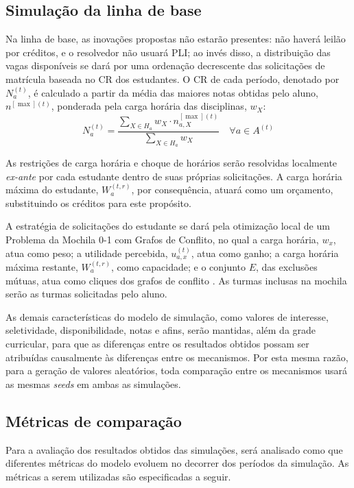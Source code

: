 \documentclass[
    12pt,
    openany,
    oneside,
    a4paper,
    english,
    brazil
]{abntex2}
\begin{document}
\subsection{Simulação da linha de base}

Na linha de base, as inovações propostas não estarão presentes: não haverá leilão por créditos, e o resolvedor não usuará PLI; ao invés disso, a distribuição das vagas disponíveis se dará por uma ordenação decrescente das solicitações de matrícula baseada no CR dos estudantes. O CR de cada período, denotado por $N_a^{(t)}$, é calculado a partir da média das maiores notas obtidas pelo aluno, $n^{[\max](t)}$, ponderada pela carga horária das disciplinas, $w_X$:
\begin{equation}
    N_a^{(t)} = \frac{\sum_{X \in H_a} w_X \cdot n_{a, X}^{[\max](t)}}{\sum_{X \in H_a} w_X}
    \quad \forall a \in A^{(t)}
\end{equation}

As restrições de carga horária e choque de horários serão resolvidas localmente \textit{ex-ante} por cada estudante dentro de suas próprias solicitações. A carga horária máxima do estudante, $W_a^{(t, r)}$, por consequência, atuará como um orçamento, substituindo os créditos para este propósito.

A estratégia de solicitações do estudante se dará pela otimização local de um Problema da Mochila 0-1 com Grafos de Conflito, no qual a carga horária, $w_x$, atua como peso; a utilidade percebida, $u_{a, x}^{(t)}$, atua como ganho; a carga horária máxima restante, $W_a^{(t, r)}$, como capacidade; e o conjunto $E$, das exclusões mútuas, atua como cliques dos grafos de conflito \cite{kellerer2004}. As turmas inclusas na mochila serão as turmas solicitadas pelo aluno.

As demais características do modelo de simulação, como valores de interesse, seletividade, disponibilidade, notas e afins, serão mantidas, além da grade curricular, para que as diferenças entre os resultados obtidos possam ser atribuídas causalmente às diferenças entre os mecanismos. Por esta mesma razão, para a geração de valores aleatórios, toda comparação entre os mecanismos usará as mesmas \textit{seeds} em ambas as simulações.

\subsection{Métricas de comparação}

Para a avaliação dos resultados obtidos das simulações, será analisado como que diferentes métricas do modelo evoluem no decorrer dos períodos da simulação. As métricas a serem utilizadas são especificadas a seguir.
\end{document}
